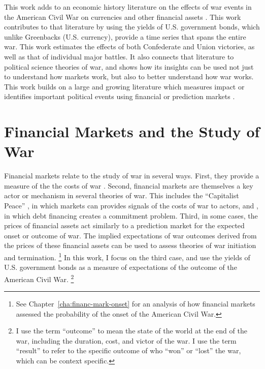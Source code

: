This work adds to an economic history literature on the effects of war events in the American Civil War on currencies and other financial assets \parencites{Mitchell1903}{Mitchell1908}{Schwab1901}{Roll1972}{Calomiris1988}{DavisPecquet1990}{WillardGuinnaneEtAl1996}{McCandless1996}{SmithSmith1997}{BrownBurdekin2000}{Weidenmier2000}{Weidenmier2002}{HaberMitchenerOosterlinckEtAl2014}.
This work contributes to that literature by using the yields of U.S. government bonds, which unlike Greenbacks (U.S. currency), provide a time series that spans the entire war. 
This work estimates the effects of both Confederate and Union victories, as well as that of individual major battles.
It also connects that  literature to political science theories of war, and shows how its insights can be used not just to understand how markets work, but also to better understand how war works.
This work builds on a large and growing literature which measures impact or identifies important political events using financial \parencites{NorthWeingast1989}{north2000introd}{FreyKucher2000}{sussman2000instit}{wells2000revol}{Herron2000}{eldor2004finan}{ChenSiems2004}{Greenstone2007} or prediction markets \parencites{WolfersZitzewitz2004}{ArrowForsytheGorhamEtAl2008}{WolfersZitzewitz2009}.




\section{Financial Markets and the Study of War}
\label{sec:barg-theory-war}

Financial markets relate to the study of war in several ways.
First, they provide a measure of the the costs of war \parencites{SchneiderTroeger2006}{GuidolinLaFerrara2010}.
Second, financial markets are themselves a key actor or mechanism in several theories of war.
This includes the ``Capitalist Peace'' \parencites{Gartzke2007}{DafoeKelsey2014a}, in which markets can provides signals of the costs of war to actors, and \textcite{Slantchev2012a}, in which debt financing creates a commitment problem.
Third, in some cases, the prices of financial assets act similarly to a prediction market for the expected onset or outcome of war.
The implied expectations of war outcomes  derived from the prices of these financial assets can be used to assess theories of war initiation and termination.%
\footnote{See Chapter~\ref{cha:financ-mark-onset} for an analysis of how financial markets assessed the probability of the onset of the American Civil War.}
In this work, I focus on the third case, and use the yields of U.S. government bonds as a measure of expectations of the outcome of the American Civil War.%
\footnote{
  I use the term ``outcome'' to mean the state of the world at the end of the war, including the duration, cost, and victor of the war.
  I use the term ``result'' to refer to the specific outcome of who ``won'' or ``lost'' the war, which can be context specific.
}

